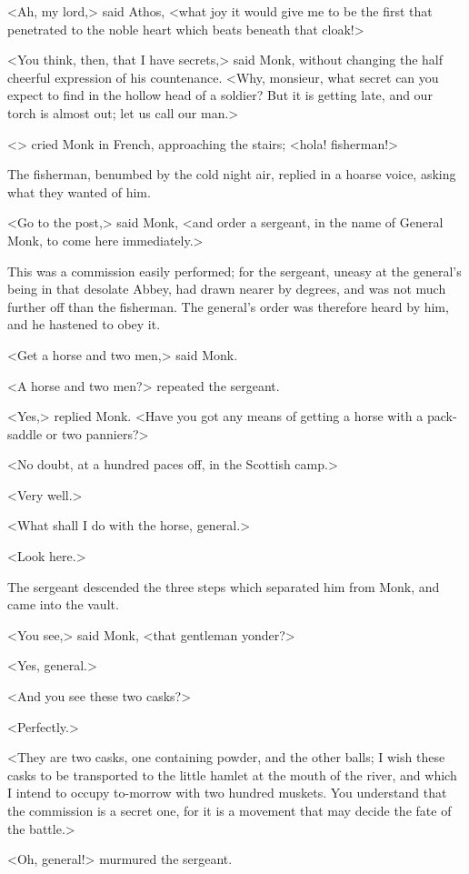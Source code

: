 <Ah, my lord,> said Athos, <what joy it would give me to be the first that penetrated to the noble heart which beats beneath that cloak!>

<You think, then, that I have secrets,> said Monk, without changing the half cheerful expression of his countenance. <Why, monsieur, what secret can you expect to find in the hollow head of a soldier? But it is getting late, and our torch is almost out; let us call our man.>

<> cried Monk in French, approaching the stairs; <hola! fisherman!>

The fisherman, benumbed by the cold night air, replied in a hoarse voice, asking what they wanted of him.

<Go to the post,> said Monk, <and order a sergeant, in the name of General Monk, to come here immediately.>

This was a commission easily performed; for the sergeant, uneasy at the general's being in that desolate Abbey, had drawn nearer by degrees, and was not much further off than the fisherman. The general's order was therefore heard by him, and he hastened to obey it.

<Get a horse and two men,> said Monk.

<A horse and two men?> repeated the sergeant.

<Yes,> replied Monk. <Have you got any means of getting a horse with a pack-saddle or two panniers?>

<No doubt, at a hundred paces off, in the Scottish camp.>

<Very well.>

<What shall I do with the horse, general.>

<Look here.>

The sergeant descended the three steps which separated him from Monk, and came into the vault.

<You see,> said Monk, <that gentleman yonder?>

<Yes, general.>

<And you see these two casks?>

<Perfectly.>

<They are two casks, one containing powder, and the other balls; I wish these casks to be transported to the little hamlet at the mouth of the river, and which I intend to occupy to-morrow with two hundred muskets. You understand that the commission is a secret one, for it is a movement that may decide the fate of the battle.>

<Oh, general!> murmured the sergeant.

